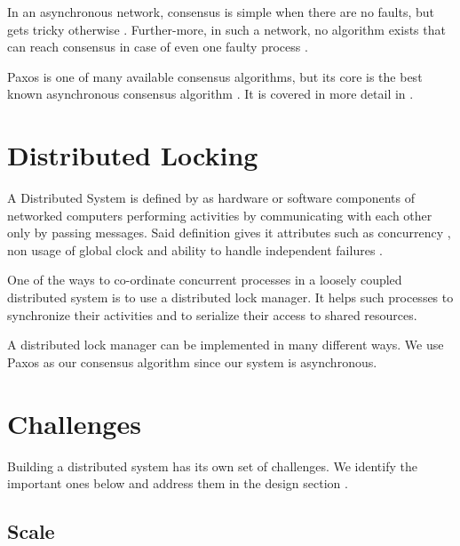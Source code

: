 In an asynchronous network, consensus is simple when there are no faults, but
gets tricky otherwise \citep{Lampson:1996:HBH}. Further-more, in such a network,
no algorithm exists that can reach consensus in case of even one faulty process
\citep{FisLynPat85}.

Paxos is one of many available consensus algorithms, but its core is the best
known asynchronous consensus algorithm \citep{Lampson:1996:HBH}. It is covered
in more detail in .

\section{Distributed Locking}

A Distributed System is defined by \citet[]{coulouris2005distributed} as
hardware or software components of networked computers performing activities by
communicating with each other only by passing messages. Said definition gives
it attributes such as concurrency%
, non usage of global clock%
and ability to handle independent failures
.

One of the ways to co-ordinate concurrent processes in a loosely coupled
distributed system is to use a distributed lock manager. It helps such
processes to synchronize their activities and to serialize their access to
shared resources.

A distributed lock manager can be implemented in many different ways. We use
Paxos as our consensus algorithm since our system is asynchronous.

\section{Challenges}

Building a distributed system has its own set of challenges. We identify the
important ones below and address them in the design section
.

\subsection{Scale}

